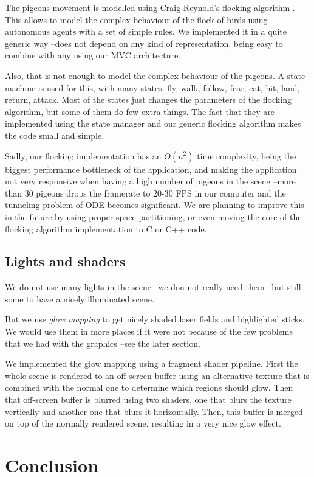 \documentclass[a4paper,10pt]{article}
\begin{document}
The pigeons movement is modelled using Craig Reynold's flocking
algorithm \cite{flocks}\cite{gamealgo}. This allows to model the
complex behaviour of the flock of birds using autonomous agents with a
set of simple rules. We implemented it in a quite generic way --does not
depend on any kind of representation, being easy to combine with any
using our MVC architecture.

Also, that is not enough to model the complex behaviour of the
pigeons. A state machine is used for this, with many states: fly,
walk, follow, fear, eat, hit, land, return, attack. Most of the states
just changes the parameters of the flocking algorithm, but some of
them do few extra things. The fact that they are implemented using the
state manager and our generic flocking algorithm makes the code small
and simple.

Sadly, our flocking implementation has an $O(n^2)$ time complexity,
being the biggest performance bottleneck of the application, and
making the application not very responsive when having a high number
of pigeons in the scene --more than 30 pigeons drops the framerate to
20-30 FPS in our computer and the tunneling problem of ODE becomes
significant. We are planning to improve this in the future by using
proper space partitioning, or even moving the core of the flocking
algorithm implementation to C or C++ code.

\subsection{Lights and shaders}

We do not use many lights in the scene --we don not really need them--
but still some to have a nicely illuminated scene.

But we use \emph{glow mapping} to get nicely shaded laser fields and
highlighted sticks. We would use them in more places if it were not
because of the few problems that we had with the graphics --see the
later section.

We implemented the glow mapping using a fragment shader
pipeline. First the whole scene is rendered to an off-screen buffer
using an alternative texture that is combined with the normal one to
determine which regions should glow. Then that off-screen buffer is
blurred using two shaders, one that blurs the texture vertically and
another one that blurs it horizontally. Then, this buffer is merged on
top of the normally rendered scene, resulting in a very nice glow
effect.



\section{Conclusion}



\end{document}
